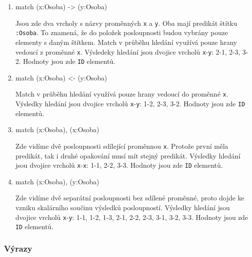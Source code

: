 \begin{enumerate}
\item
\begin{code}
match (x:Osoba) -> (y:Osoba)
\end{code}
Jsou zde dva vrcholy s názvy proměnných \texttt{x} a \texttt{y}.
Oba mají predikát štítku \texttt{:Osoba}.
To znamená, že do položek posloupnosti budou vybrány pouze elementy s daným štítkem.
Match v průběhu hledání využívá pouze hrany vedoucí z proměnné \texttt{x}.
Výsledeky hledání jsou dvojice vrcholů \texttt{x}-\texttt{y}: 2-1, 2-3, 3-2.
Hodnoty jsou zde \texttt{ID} elementů.

\item
\begin{code}
match (x:Osoba) <- (y:Osoba)
\end{code}
Match v průběhu hledání využívá pouze hrany vedoucí do proměnné \texttt{x}.
Výsledky hledání jsou dvojice vrcholů \texttt{x}-\texttt{y}: 1-2, 2-3, 3-2.
Hodnoty jsou zde \texttt{ID} elementů.

\item
\begin{code}
match (x:Osoba), (x:Osoba) 
\end{code}
Zde vidíme dvě posloupnosti sdílející proměnnou \texttt{x}.
Protože první měla predikát, tak i druhé opakování musí mít stejný predikát.
Výsledky hledání jsou dvojice vrcholů \texttt{x}-\texttt{x}: 1-1, 2-2, 3-3.
Hodnoty jsou zde \texttt{ID} elementů.

\item
\begin{code}
match (x:Osoba), (y:Osoba) 
\end{code}
Zde vidíme dvě separátní posloupnosti bez sdílené proměnné, proto dojde ke vzniku skalárního součinu výsledků posloupností.
Výsledky hledání jsou dvojice vrcholů \texttt{x}-\texttt{y}: 1-1, 1-2, 1-3, 2-1, 2-2, 2-3, 3-1, 3-2, 3-3.
Hodnoty jsou zde \texttt{ID} elementů.

\end{enumerate}

\subsubsection{Výrazy}

